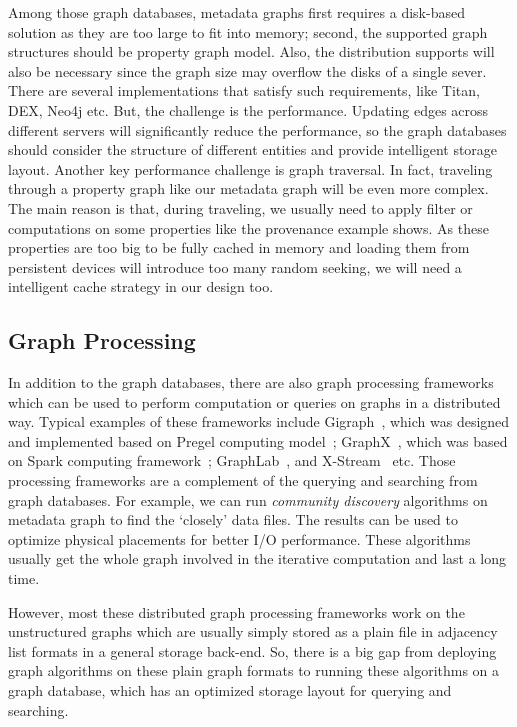 Among those graph databases, metadata graphs first requires a disk-based solution as they are too large to fit into memory; second, the supported graph structures should be property graph model. Also, the distribution supports will also be necessary since the graph size may overflow the disks of a single sever. There are several implementations that satisfy such requirements, like Titan, DEX, Neo4j etc. But, the challenge is the performance. Updating edges across different servers will significantly reduce the performance, so the graph databases should consider the structure of different entities and provide intelligent storage layout.  Another key performance challenge is graph traversal. In fact, traveling through a property graph like our metadata graph will be even more complex. The main reason is that, during traveling, we usually need to apply filter or computations on some properties like the provenance example shows. As these properties are too big to be fully cached in memory and loading them from persistent devices will introduce too many random seeking, we will need a intelligent cache strategy in our design too.
\subsection{Graph Processing}

In addition to the graph databases, there are also graph processing frameworks which can be used to perform computation or queries on graphs in a distributed way. Typical examples of these frameworks include Gigraph~\cite{gigraph}, which was designed and implemented based on Pregel computing model~\cite{malewicz2010pregel}; GraphX~\cite{xin2013graphx}, which was based on Spark computing framework~\cite{zaharia2010spark}; GraphLab~\cite{low2010graphlab}, and X-Stream~\cite{roy2013x} etc. Those processing frameworks are a complement of the querying and searching from graph databases. For example, we can run \textit{community discovery} algorithms on metadata graph to find the `closely' data files. The results can be used to optimize physical placements for better I/O performance. These algorithms usually get the whole graph involved in the iterative computation and last a long time. 

However, most these distributed graph processing frameworks work on the unstructured graphs which are usually simply stored as a plain file in adjacency list formats in a general storage back-end. So, there is a big gap from deploying graph algorithms on these plain graph formats to running these algorithms on a graph database, which has an optimized storage layout for querying and searching.

